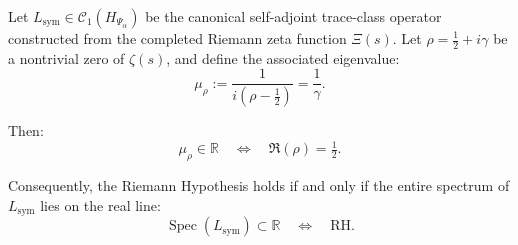 \begin{lemma}
\label{lem:reality-of-spectrum-and-rh}
Let \( L_{\mathrm{sym}} \in \mathcal{C}_1(H_{\Psi_\alpha}) \) be the canonical self-adjoint trace-class operator constructed from the completed Riemann zeta function \( \Xi(s) \). Let \( \rho = \tfrac{1}{2} + i\gamma \) be a nontrivial zero of \( \zeta(s) \), and define the associated eigenvalue:
\[
\mu_\rho := \frac{1}{i(\rho - \tfrac{1}{2})} = \frac{1}{\gamma}.
\]

Then:
\[
\mu_\rho \in \mathbb{R} \quad \Longleftrightarrow \quad \Re(\rho) = \tfrac{1}{2}.
\]

\medskip
\noindent
Consequently, the Riemann Hypothesis holds if and only if the entire spectrum of \( L_{\mathrm{sym}} \) lies on the real line:
\[
\operatorname{Spec}(L_{\mathrm{sym}}) \subset \mathbb{R} \quad \Longleftrightarrow \quad \mathrm{RH}.
\]
\end{lemma}
% 